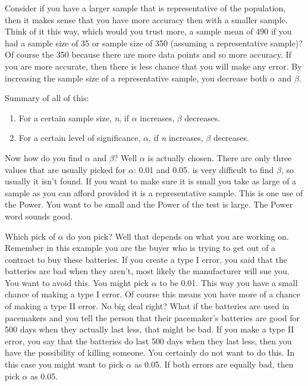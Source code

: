 \documentclass[]{book}
\begin{document}
Consider if you have a larger sample that is representative of the population, then it makes sense that you have more accuracy then with a smaller sample. Think of it this way, which would you trust more, a sample mean of 490 if you had a sample size of 35 or sample size of 350 (assuming a representative sample)? Of course the 350 because there are more data points and so more accuracy. If you are more accurate, then there is less chance that you will make any error. By increasing the sample size of a representative sample, you decrease both \(\alpha\) and \(\beta\).

Summary of all of this:

\begin{enumerate}
\def\labelenumi{\arabic{enumi}.}
\item
  For a certain sample size, \emph{n}, if \(\alpha\) increases, \(\beta\) decreases.
\item
  For a certain level of significance, \(\alpha\), if \emph{n} increases, \(\beta\) decreases.
\end{enumerate}

Now how do you find \(\alpha\) and \(\beta\)? Well \(\alpha\) is actually chosen. There are only three values that are usually picked for \(\alpha\): 0.01 and 0.05. is very difficult to find \(\beta\), so usually it isn't found. If you want to make sure it is small you take as large of a sample as you can afford provided it is a representative sample. This is one use of the Power. You want to be small and the Power of the test is large. The Power word sounds good.

Which pick of \(\alpha\) do you pick? Well that depends on what you are working on. Remember in this example you are the buyer who is trying to get out of a contract to buy these batteries. If you create a type I error, you said that the batteries are bad when they aren't, most likely the manufacturer will sue you. You want to avoid this. You might pick \(\alpha\) to be 0.01. This way you have a small chance of making a type I error. Of course this means you have more of a chance of making a type II error. No big deal right? What if the batteries are used in pacemakers and you tell the person that their pacemaker's batteries are good for 500 days when they actually last less, that might be bad. If you make a type II error, you say that the batteries do last 500 days when they last less, then you have the possibility of killing someone. You certainly do not want to do this. In this case you might want to pick \(\alpha\) as 0.05. If both errors are equally bad, then pick \(\alpha\) as 0.05.
\end{document}
